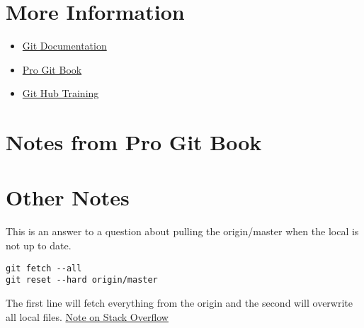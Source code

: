 \documentclass[11pt]{article} %
\begin{document}
\section{More Information}
\begin{itemize}
\item \href{http://git-scm.com/docs}{Git Documentation}
\item  \href{http://git-scm.com/book}{Pro Git Book}
\item \href{https://help.github.com/}{Git Hub Training}
\end{itemize}

\section{Notes from Pro Git Book}

\section{Other Notes}

This is an answer to a question about pulling the origin/master when the local is not up to date. 

\begin{lstlisting}
git fetch --all
git reset --hard origin/master
\end{lstlisting}

The first line will fetch everything from the origin and the second will overwrite all local files. 
\href{http://stackoverflow.com/questions/1125968/force-git-to-overwrite-local-files-on-pull}{Note on Stack Overflow}
\end{document}
